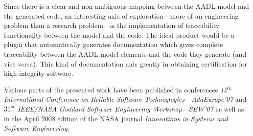 Since there is a clear and non-ambiguous mapping between the AADL
model and the generated code, an interesting axis of
exploration---more of an engineering problem than a research
problem---is the implementation of traceability functionality between
the model and the code. The ideal product would be a plugin that
automatically generates documentation which gives complete
traceability between the AADL model elements and the code they
generate (and vice versa). This kind of documentation aids greatly in
obtaining certification for high-integrity software.

Various parts of the presented work have been published in conferences
\emph{12$^{th}$ International Conference on Reliable Software
  Technoglogies---AdaEurope'07} and \emph{$31^{st}$ IEEE/NASA Goddard
  Software Engineering Workshop---SEW'07} as well as in the April 2008
edition of the NASA journal \emph{Innovations in Systems and Software
  Engineering}.

